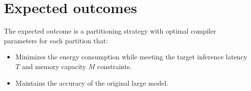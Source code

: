 \section{Expected outcomes}
The expected outcome is a partitioning strategy with optimal compiler parameters for each partition that:
\begin{itemize}
    \item Minimizes the energy consumption while meeting the target inference latency $T$ and memory capacity $M$ constraints.
    \item Maintains the accuracy of the original large model.
\end{itemize}
